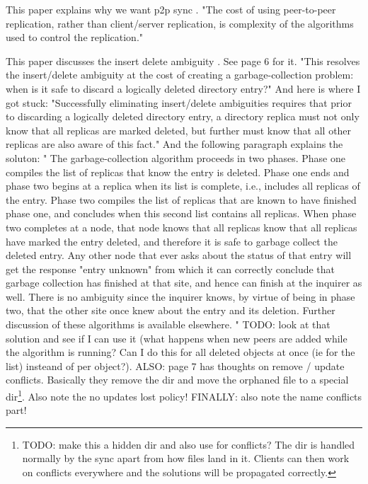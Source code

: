 This paper explains why we want p2p sync \cite{reiher1996peer}.
"The cost of using peer-to-peer replication, rather than client/server replication, is complexity of the algorithms used to control the replication."

This paper discusses the insert delete ambiguity \cite{page1998perspectives}.
See page 6 for it.
"This resolves the insert/delete ambiguity at the cost of creating a garbage-collection problem: when is it safe to discard a logically deleted directory entry?"
And here is where I got stuck: "Successfully eliminating insert/delete ambiguities requires that prior to discarding a logically deleted directory entry, a directory replica must not only know that all replicas are marked deleted, but further must know that all other replicas are also aware of this fact."
And the following paragraph explains the soluton: "
The garbage-collection algorithm proceeds in two phases.
Phase one compiles the list of replicas that know the entry is deleted.
Phase one ends and phase two begins at a replica when its list is complete, i.e., includes all replicas of the entry.
Phase two compiles the list of replicas that are known to have finished phase one, and concludes when this second list contains all replicas.
When phase two completes at a node, that node knows that all replicas know that all replicas have marked the entry deleted, and therefore it is safe to garbage collect the deleted entry.
Any other node that ever asks about the status of that entry will get the response "entry unknown" from which it can correctly conclude that garbage collection has finished at that site, and hence can finish at the inquirer as well.
There is no ambiguity since the inquirer knows, by virtue of being in phase two, that the other site once knew about the entry and its deletion.
Further discussion of these algorithms is available elsewhere.
"
TODO: look at that solution and see if I can use it (what happens when new peers are added while the algorithm is running? Can I do this for all deleted objects at once (ie for the list) insteand of per object?).
ALSO: page 7 has thoughts on remove / update conflicts.
Basically they remove the dir and move the orphaned file to a special dir\footnote{TODO: make this a hidden dir and also use for conflicts? The dir is handled normally by the sync apart from how files land in it. Clients can then work on conflicts everywhere and the solutions will be propagated correctly.}.
Also note the no updates lost policy!
FINALLY: also note the name conflicts part!
